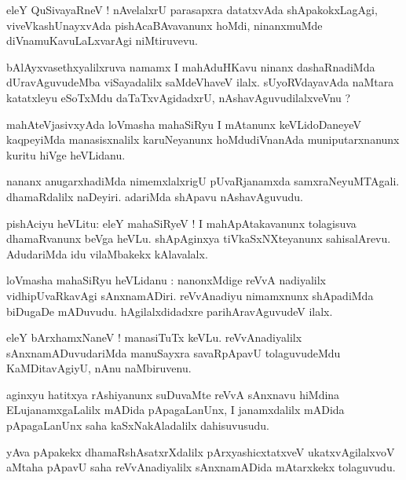 \documentclass{article}
\begin{document}
\begin{mn}
eleY QuSivayaRneV ! nAvelalxrU parasapxra datatxvAda shApakokxLagAgi, viveVkashUnayxvAda 
pishAcaBAvavanunx hoMdi, ninanxmuMde diVnamuKavuLaLxvarAgi niMtiruvevu.
\end{mn}

\begin{mn}
bAlAyxvasethxyalilxruva namamx I mahAduHKavu ninanx dashaRnadiMda dUravAguvudeMba viSayadalilx 
saMdeVhaveV ilalx. sUyoRVdayavAda naMtara katatxleyu eSoTxMdu daTaTxvAgidadxrU, 
nAshavAguvudilalxveVnu ?
\end{mn}

\begin{mn}
mahAteVjasivxyAda loVmasha mahaSiRyu I mAtanunx keVLidoDaneyeV kaqpeyiMda manasisxnalilx 
karuNeyanunx hoMdudiVnanAda muniputarxnanunx kuritu hiVge heVLidanu.
\end{mn}

\begin{mn}
nananx anugarxhadiMda nimemxlalxrigU pUvaRjanamxda samxraNeyuMTAgali. dhamaRdalilx naDeyiri. 
adariMda shApavu nAshavAguvudu.
\end{mn}

\begin{mn}
pishAciyu heVLitu: eleY mahaSiRyeV ! I mahApAtakavanunx tolagisuva dhamaRvanunx beVga heVLu.
shApAginxya tiVkaSxNXteyanunx sahisalArevu. AdudariMda idu vilaMbakekx kAlavalalx.
\end{mn}

\begin{mn}
loVmasha mahaSiRyu heVLidanu : nanonxMdige reVvA nadiyalilx vidhipUvaRkavAgi sAnxnamADiri. 
reVvAnadiyu nimamxnunx shApadiMda biDugaDe mADuvudu. hAgilalxdidadxre parihAravAguvudeV ilalx.
\end{mn}

\begin{mn}
eleY bArxhamxNaneV ! manasiTuTx keVLu. reVvAnadiyalilx  sAnxnamADuvudariMda manuSayxra savaRpApavU
tolaguvudeMdu KaMDitavAgiyU, nAnu naMbiruvenu.
\end{mn}

\begin{mn}
aginxyu hatitxya rAshiyanunx suDuvaMte reVvA sAnxnavu hiMdina ELujanamxgaLalilx  mADida 
pApagaLanUnx, I janamxdalilx mADida pApagaLanUnx saha kaSxNakAladalilx dahisuvusudu.
\end{mn}

\begin{mn}
yAva pApakekx dhamaRshAsatxrXdalilx pArxyashicxtatxveV ukatxvAgilalxvoV aMtaha pApavU saha 
reVvAnadiyalilx sAnxnamADida mAtarxkekx tolaguvudu.
\end{mn}
\end{document}
